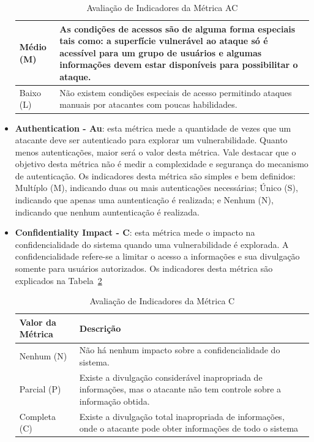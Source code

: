 \begin{itemize}
\begin{table}[H]
\begin{center}
\begin{tabular}{ | l | p{10cm} |}
	    Médio (M) & As condições de acessos são de alguma forma especiais tais como: a superfície vulnerável ao ataque só é acessível para um grupo de usuários e algumas informações devem estar disponíveis para possibilitar o ataque. \\ \hline
	    Baixo (L) & Não existem condições especiais de acesso permitindo ataques manuais por atacantes com poucas habilidades.\\ \hline
	    \end{tabular}
	    \caption{Avaliação de Indicadores da Métrica AC}
	    \label{tab:ac_scoring}
	\end{center}
	\end{table}
\item \textbf{Authentication - Au}: esta métrica mede a quantidade de vezes que um atacante deve ser autenticado para explorar um vulnerabilidade. Quanto menos autenticações, maior será o valor desta métrica. Vale destacar que o objetivo desta métrica não é medir a complexidade e segurança do mecanismo de autenticação. Os indicadores desta métrica são simples e bem definidos: Multíplo (M), indicando duas ou mais autenticações necessárias; Único (S), indicando que apenas uma auntenticação é realizada; e Nenhum (N), indicando que nenhum auntenticação é realizada.
\item \textbf{Confidentiality Impact - C}: esta métrica mede o impacto na confidencialidade do sistema quando uma vulnerabilidade é explorada. A confidencialidade refere-se a limitar o acesso a informações e sua divulgação somente para usuários autorizados. Os indicadores desta métrica são explicados na Tabela~\ref{tab:c_scoring}
	\begin{table}[H]
	\begin{center}
	    \begin{tabular}{ | l | p{10cm} |}
	    \hline
	    Valor da Métrica & Descrição \\ \hline
	    Nenhum (N) & Não há nenhum impacto sobre a confidencialidade do sistema. \\ \hline
	    Parcial (P) & Existe a divulgação considerável inapropriada de informações, mas o atacante não tem controle sobre a informação obtida.  \\ \hline
	    Completa (C) & Existe a divulgação total inapropriada de informações, onde o atacante pode obter informações de todo o sistema\\ \hline
	    \end{tabular}
	    \caption{Avaliação de Indicadores da Métrica C}
	    \label{tab:c_scoring}

\end{center}
\end{table}
\end{itemize}
